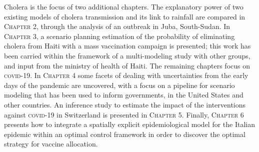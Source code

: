 Cholera is the focus of two additional chapters. The explanatory power of two existing models of cholera transmission and its link to rainfall are compared in \textsc{Chapter 2}, through the analysis of an outbreak in Juba, South-Sudan. In \textsc{Chapter 3}, a scenario planning estimation of the probability of eliminating cholera from Haiti with a mass vaccination campaign is presented; this work has been carried within the framework of a multi-modeling study with other groups, and input from the ministry of health of Haiti.
The remaining chapters focus on \textsc{covid}-19. In \textsc{Chapter 4} some facets of dealing with uncertainties from the early days of the pandemic are uncovered, with a focus on a pipeline for scenario modeling that has been used to inform governments, in the United States and other countries. 
An inference study to estimate the impact of the interventions against \textsc{covid}-19 in Switzerland is presented in \textsc{Chapter 5}.
Finally, \textsc{Chapter 6} presents how to integrate a spatially explicit epidemiological model for the Italian epidemic within an optimal control framework in order to discover the optimal strategy for vaccine allocation.



